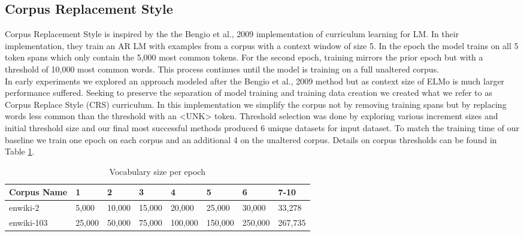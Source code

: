 \subsection{Corpus Replacement Style}
Corpus Replacement Style is inspired by the the Bengio et al., 2009 \cite{Bengio2009CurriculumL} implementation of curriculum learning for LM. In their implementation, they train an AR LM with examples from a corpus with a context window of size 5. In the epoch the model trains on all 5 token spans which only contain the 5,000 most common tokens. For the second epoch, training mirrors the prior epoch but with a threshold of 10,000 most common words. This process continues until the model is training on a full unaltered corpus. \\
In early experiments we explored an approach modeled after the Bengio et al., 2009 method but as context size of ELMo is much larger performance suffered. Seeking to preserve the separation of model training and training data creation we created what we refer to as Corpus Replace Style (CRS) curriculum. In this implementation we simplify the corpus not by removing training spans but by replacing words less common than the threshold with an <UNK> token. Threshold selection was done by exploring various increment sizes and initial threshold size and our final most successful methods produced 6 unique datasets for input dataset. To match the training time of our baseline we train one epoch on each corpus and an additional 4 on the unaltered corpus. Details on corpus thresholds can be found in Table \ref{table:2}.
\begin{table}[h!]
\begin{center}
\begin{tabular}{|l|l|l|l|l|l|l|l|} \hline
\textbf{Corpus Name} & \textbf{1} & \textbf{2} & \textbf{3} & \textbf{4} & \textbf{5} & \textbf{6} & \textbf{7-10}  \\ \hline
enwiki-2 & 5,000 & 10,000 & 15,000 & 20,000 & 25,000 & 30,000 & 33,278 \\ \hline
enwiki-103 & 25,000 & 50,000 & 75,000 & 100,000 & 150,000  & 250,000 & 267,735\\ \hline
\end{tabular}
\caption{Vocabulary size per epoch}
\label{table:2}
\end{center}
\end{table}
